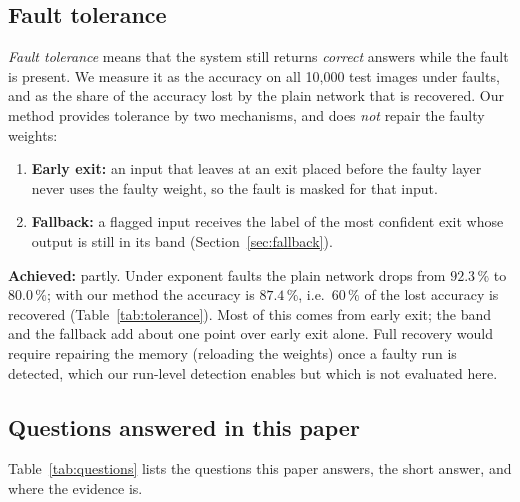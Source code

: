 \documentclass[10pt,a4paper]{article}
\begin{document}
\subsection{Fault tolerance}\label{sec:deftol}

\emph{Fault tolerance} means that the system still returns \emph{correct} answers while the fault is present.
We measure it as the accuracy on all 10{,}000 test images under faults, and as the share of the accuracy lost by
the plain network that is recovered. Our method provides tolerance by two mechanisms, and does \emph{not} repair
the faulty weights:
\begin{enumerate}
  \item \textbf{Early exit:} an input that leaves at an exit placed before the faulty layer never uses the faulty
        weight, so the fault is masked for that input.
  \item \textbf{Fallback:} a flagged input receives the label of the most confident exit whose output is still in
        its band (Section~\ref{sec:fallback}).
\end{enumerate}
\textbf{Achieved:} partly. Under exponent faults the plain network drops from $92.3\,\%$ to $80.0\,\%$; with our
method the accuracy is $87.4\,\%$, i.e.\ $60\,\%$ of the lost accuracy is recovered (Table~\ref{tab:tolerance}).
Most of this comes from early exit; the band and the fallback add about one point over early exit alone. Full
recovery would require repairing the memory (reloading the weights) once a faulty run is detected, which our
run-level detection enables but which is not evaluated here.

\subsection{Questions answered in this paper}

Table~\ref{tab:questions} lists the questions this paper answers, the short answer, and where the evidence is.
\end{document}
